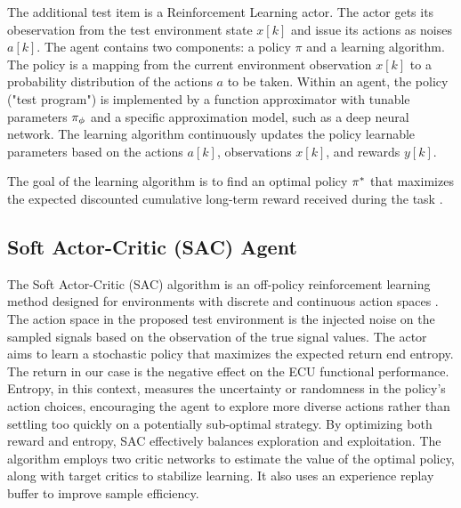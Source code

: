\documentclass[a4paper, fleqn]{template/cas-dc}
\begin{document}
	The additional test item is a Reinforcement Learning actor. The actor gets its obeservation from the test environment state $x[k]$ and issue its actions as noises $a[k]$.
	The agent contains two components: a policy $\pi$ and a learning algorithm.
	The policy is a mapping from the current environment observation $x[k]$ to a probability distribution of the actions $a$ to be taken. Within an agent, the policy ("test program") is implemented by a function approximator with tunable parameters $\pi_{\phi}$ and a specific approximation model, such as a deep neural network.
	The learning algorithm continuously updates the policy learnable parameters based on the actions $a[k]$, observations $x[k]$, and rewards $y[k]$. 
	
	The goal of the learning algorithm is to find an optimal policy $\pi^*$ that maximizes the expected discounted cumulative long-term reward received during the task \cite{sutton1998reinforcement}.
	
	\subsection{Soft Actor-Critic (SAC) Agent}
	The Soft Actor-Critic (SAC) algorithm is an off-policy reinforcement learning method designed for environments with discrete and continuous action spaces \cite{christodoulou2019soft, haarnoja2018soft}. The action space in the proposed test environment is the injected noise on the sampled signals based on the observation of the true signal values. The actor aims to learn a stochastic policy that maximizes the expected return end entropy. The return in our case is the negative effect on the ECU functional performance. Entropy, in this context, measures the uncertainty or randomness in the policy’s action choices, encouraging the agent to explore more diverse actions rather than settling too quickly on a potentially sub-optimal strategy. By optimizing both reward and entropy, SAC effectively balances exploration and exploitation. The algorithm employs two critic networks to estimate the value of the optimal policy, along with target critics to stabilize learning. It also uses an experience replay buffer to improve sample efficiency.
	
\end{document}

